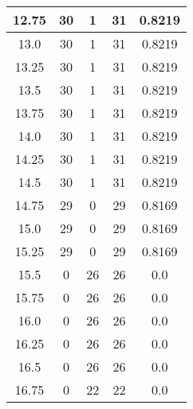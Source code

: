 \documentclass[letterpaper, 12pt]{article}
\begin{document}
\begin{longtable}{|c|c|c|c|c|}
\hline
12.75 & 30 & 1 & 31 & 0.8219 \\
\hline
13.0 & 30 & 1 & 31 & 0.8219 \\
\hline
13.25 & 30 & 1 & 31 & 0.8219 \\
\hline
13.5 & 30 & 1 & 31 & 0.8219 \\
\hline
13.75 & 30 & 1 & 31 & 0.8219 \\
\hline
14.0 & 30 & 1 & 31 & 0.8219 \\
\hline
14.25 & 30 & 1 & 31 & 0.8219 \\
\hline
14.5 & 30 & 1 & 31 & 0.8219 \\
\hline
14.75 & 29 & 0 & 29 & 0.8169 \\
\hline
15.0 & 29 & 0 & 29 & 0.8169 \\
\hline
15.25 & 29 & 0 & 29 & 0.8169 \\
\hline
15.5 & 0 & 26 & 26 & 0.0 \\
\hline
15.75 & 0 & 26 & 26 & 0.0 \\
\hline
16.0 & 0 & 26 & 26 & 0.0 \\
\hline
16.25 & 0 & 26 & 26 & 0.0 \\
\hline
16.5 & 0 & 26 & 26 & 0.0 \\
\hline
16.75 & 0 & 22 & 22 & 0.0 \\
\hline
\end{longtable}
\end{document}
